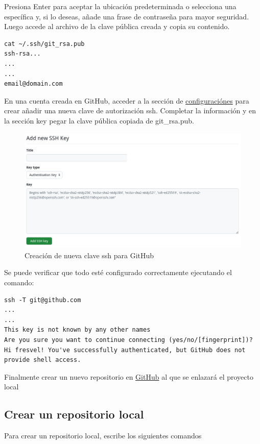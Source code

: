 Presiona Enter para aceptar la ubicación predeterminada o selecciona una específica y, si lo deseas, añade una frase de contraseña para mayor seguridad. 
Luego accede al archivo de la clave pública creada y copia su contenido.

\begin{terbox}
    \begin{verbatim}
cat ~/.ssh/git_rsa.pub
ssh-rsa...
... 
...
email@domain.com
    \end{verbatim}
    \end{terbox}
    
    En una cuenta creada en GitHub, acceder a la sección de \href{https://github.com/settings/keys}{configuraciónes} para crear añadir una nueva clave de autorización ssh. 
    Completar la información y en la sección key pegar la clave pública copiada de git\_rsa.pub.
\begin{figure}[H]
    \centering
    \includegraphics[width=0.8\linewidth]{Imagenes/sshkey.png}
    \caption{Creación de nueva clave ssh para GitHub}
    \label{fig_sshkey}
\end{figure}


Se puede verificar que todo esté configurado correctamente ejecutando el comando:

\begin{terbox}
    \begin{verbatim}
ssh -T git@github.com
...
...
This key is not known by any other names
Are you sure you want to continue connecting (yes/no/[fingerprint])?
Hi fresvel! You've successfully authenticated, but GitHub does not 
provide shell access.
    \end{verbatim}
\end{terbox}

Finalmente crear un nuevo repositorio en \href{https://github.com/new}{GitHub} al que se enlazará el proyecto local

\subsection{Crear un repositorio local}
Para crear un repositorio local, escribe los siguientes comandos

